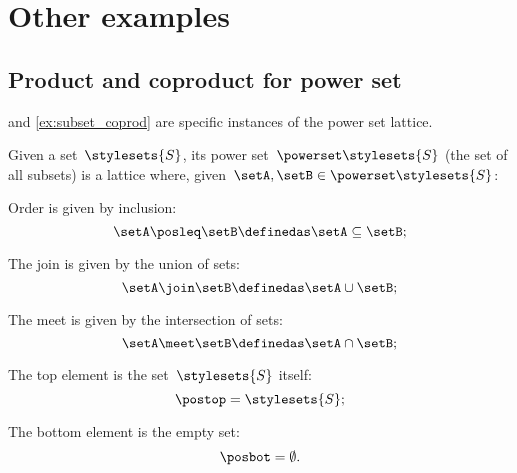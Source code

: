

\section{Other examples}

\subsection{Product and coproduct for power set}
 and \cref{ex:subset_coprod} are specific instances of the power set lattice.

\begin{definition}
    \label{def:power-set-as-lattice}
    Given a set~$\stylesets{S}$, its power set~$\powerset \stylesets{S}$ (the set of all subsets) is a lattice where, given~$\setA,\setB\in \powerset \stylesets{S}$:
    \begin{compactitem}
        \item Order is given by inclusion:
        \begin{equation*}
            \setA\posleq \setB \definedas \setA\subseteq \setB;
        \end{equation*}
        \item The join is given by the union of sets:
        \begin{equation*}
            \setA\join \setB \definedas \setA\cup \setB;
        \end{equation*}
        \item The meet is given by the intersection of sets:
        \begin{equation*}
            \setA\meet \setB \definedas \setA\cap \setB;
        \end{equation*}
        \item The top element is the set~$\stylesets{S}$ itself:
        \begin{equation*}
            \postop = \stylesets{S};
        \end{equation*}
        \item The bottom element is the empty set:
        \begin{equation*}
            \posbot = \emptyset.
        \end{equation*}
    \end{compactitem}
\end{definition}

\begin{marginfigure}
    \centering
    \caption{}
    \label{fig:prod_coprod_power}
\end{marginfigure}

